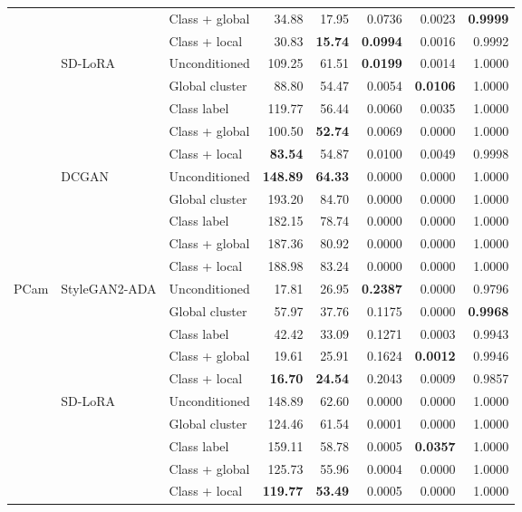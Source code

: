 \begin{table}[htbp]
\begin{tabular}{lllrrrrr}
 &  & Class + global & 34.88 & 17.95 & 0.0736 & 0.0023 & \textbf{0.9999} \\
 &  & Class + local & 30.83 & \textbf{15.74} & \textbf{0.0994} & 0.0016 & 0.9992 \\
\cmidrule(lr){2-8}
 & \multirow{5}{*}{SD-LoRA} & Unconditioned & 109.25 & 61.51 & \textbf{0.0199} & 0.0014 & 1.0000 \\
 &  & Global cluster & 88.80 & 54.47 & 0.0054 & \textbf{0.0106} & 1.0000 \\
 &  & Class label & 119.77 & 56.44 & 0.0060 & 0.0035 & 1.0000 \\
 &  & Class + global & 100.50 & \textbf{52.74} & 0.0069 & 0.0000 & 1.0000 \\
 &  & Class + local & \textbf{83.54} & 54.87 & 0.0100 & 0.0049 & 0.9998 \\
\cmidrule(lr){2-8}
 & \multirow{5}{*}{DCGAN} & Unconditioned & \textbf{148.89} & \textbf{64.33} & 0.0000 & 0.0000 & 1.0000 \\
 &  & Global cluster & 193.20 & 84.70 & 0.0000 & 0.0000 & 1.0000 \\
 &  & Class label & 182.15 & 78.74 & 0.0000 & 0.0000 & 1.0000 \\
 &  & Class + global & 187.36 & 80.92 & 0.0000 & 0.0000 & 1.0000 \\
 &  & Class + local & 188.98 & 83.24 & 0.0000 & 0.0000 & 1.0000 \\
\midrule
\multirow{15}{*}{PCam} & \multirow{5}{*}{StyleGAN2-ADA} & Unconditioned & 17.81 & 26.95 & \textbf{0.2387} & 0.0000 & 0.9796 \\
 &  & Global cluster & 57.97 & 37.76 & 0.1175 & 0.0000 & \textbf{0.9968} \\
 &  & Class label & 42.42 & 33.09 & 0.1271 & 0.0003 & 0.9943 \\
 &  & Class + global & 19.61 & 25.91 & 0.1624 & \textbf{0.0012} & 0.9946 \\
 &  & Class + local & \textbf{16.70} & \textbf{24.54} & 0.2043 & 0.0009 & 0.9857 \\
\cmidrule(lr){2-8}
 & \multirow{5}{*}{SD-LoRA} & Unconditioned & 148.89 & 62.60 & 0.0000 & 0.0000 & 1.0000 \\
 &  & Global cluster & 124.46 & 61.54 & 0.0001 & 0.0000 & 1.0000 \\
 &  & Class label & 159.11 & 58.78 & 0.0005 & \textbf{0.0357} & 1.0000 \\
 &  & Class + global & 125.73 & 55.96 & 0.0004 & 0.0000 & 1.0000 \\
 &  & Class + local & \textbf{119.77} & \textbf{53.49} & 0.0005 & 0.0000 & 1.0000 \\

\end{tabular}
\end{table}
